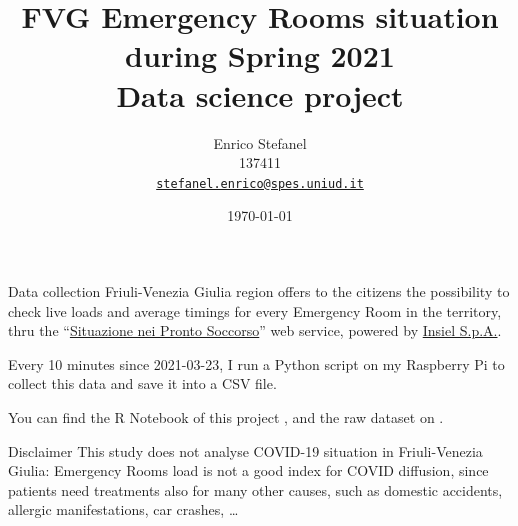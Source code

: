 \documentclass[8pt,english,aspectratio=169]{beamer}
\title[FVG Emergency Rooms situation]{FVG Emergency Rooms situation\\during Spring 2021\\\smallskip \small Data science project}
\author[\href{mailto:stefanel.enrico@spes.uniud.it}{Enrico Stefanel}]{Enrico Stefanel\\137411\\\href{mailto:stefanel.enrico@spes.uniud.it}{\texttt{stefanel.enrico@spes.uniud.it}}}
\date{\today}
\begin{document}
\begin{frame}
  \titlepage
\end{frame}

\begin{frame}{Data collection}
Friuli-Venezia Giulia region offers to the citizens the possibility to check live loads and average timings for every Emergency Room in the territory, thru the ``\href{https://servizionline.sanita.fvg.it/psonline}{Situazione nei Pronto Soccorso}'' web service, powered by \href{https://www.insiel.it/}{Insiel S.p.A.}.

Every 10 minutes since 2021-03-23, I run a Python script on my Raspberry Pi to collect this data and save it into a CSV file.

\medskip
\begin{center}
\end{center}
\bigskip

You can find the R Notebook of this project \href{http://uniud.enricostefanel.it/datascience/project/FVG_emergency_rooms_situation.html}{\color{gray}{at this link}}, and the raw dataset on \href{https://www.kaggle.com/enstit/friuli-venezia-giulia-emergency-rooms-situation}{\color{gray}{Kaggle}}.

\begin{block}{Disclaimer}
This study does not analyse COVID-19 situation in Friuli-Venezia Giulia: Emergency Rooms load is not a good index for COVID diffusion, since patients need treatments also for many other causes, such as domestic accidents, allergic manifestations, car crashes, \dots 
\end{block}

\end{frame}
\end{document}
